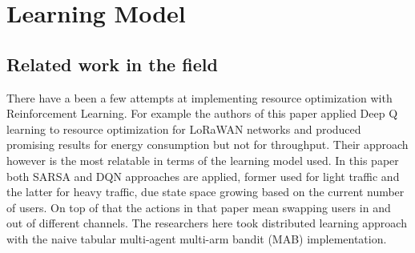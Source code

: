 
\chapter{Learning Model}



\section{Related work in the field}

There have a been a few attempts at implementing resource optimization with Reinforcement Learning. For example the
authors of this paper \cite{rl_lora_original} applied 
Deep Q learning to resource optimization for LoRaWAN
networks and produced promising results for energy
consumption but not for throughput. Their approach
however is the most relatable in terms of the learning
model used. In this paper \cite{rl_lora_sarsa_dqn} both
SARSA and DQN approaches are applied, former used for
light traffic and the latter for heavy traffic, due state
space growing based on the current number of users. On
top of that the actions in that paper mean swapping users
in and out of different channels. The researchers here 
\cite{rl_distributed_mab} took distributed learning
approach with the naive tabular multi-agent multi-arm
bandit (MAB) implementation.

